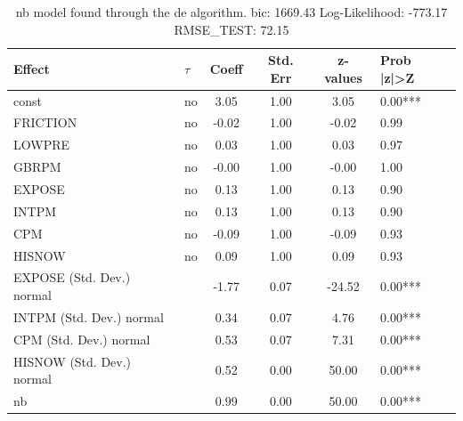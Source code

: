\begin{table}
	\caption{nb model found through the de algorithm. bic: 1669.43 Log-Likelihood: -773.17 RMSE_TEST: 72.15}
	\begin{center}
		\begin{tabular}{|l|l|c|c|c|l|}
			\hline
			Effect & $\tau$ & Coeff & Std. Err & z-values & Prob |z|>Z \\
			\hline
			const & no & 3.05 & 1.00 & 3.05 & 0.00*** \\
			\hline
			FRICTION & no & -0.02 & 1.00 & -0.02 & 0.99 \\
			\hline
			LOWPRE & no & 0.03 & 1.00 & 0.03 & 0.97 \\
			\hline
			GBRPM & no & -0.00 & 1.00 & -0.00 & 1.00 \\
			\hline
			EXPOSE & no & 0.13 & 1.00 & 0.13 & 0.90 \\
			\hline
			INTPM & no & 0.13 & 1.00 & 0.13 & 0.90 \\
			\hline
			CPM & no & -0.09 & 1.00 & -0.09 & 0.93 \\
			\hline
			HISNOW & no & 0.09 & 1.00 & 0.09 & 0.93 \\
			\hline
			EXPOSE (Std. Dev.) normal &  & -1.77 & 0.07 & -24.52 & 0.00*** \\
			\hline
			INTPM (Std. Dev.) normal &  & 0.34 & 0.07 & 4.76 & 0.00*** \\
			\hline
			CPM (Std. Dev.) normal &  & 0.53 & 0.07 & 7.31 & 0.00*** \\
			\hline
			HISNOW (Std. Dev.) normal &  & 0.52 & 0.00 & 50.00 & 0.00*** \\
			\hline
			nb &  & 0.99 & 0.00 & 50.00 & 0.00*** \\
			\hline
		\end{tabular}
	\end{center}
\end{table}